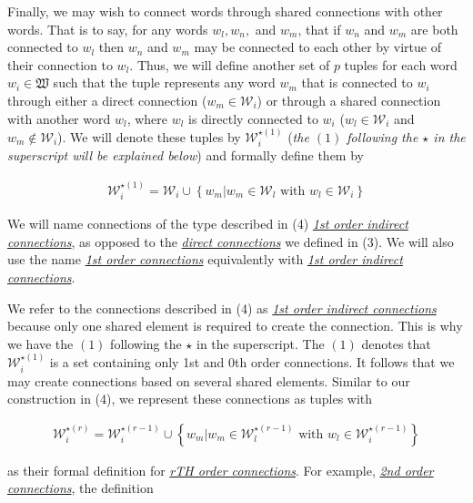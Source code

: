 \documentclass{article}[12pt]
\begin{document}
\begin{flushleft}
Finally, we may wish to connect words through shared connections with other words.  That is to say, for any words $w_l, w_n,$ and $w_m$, that if $w_n$ and $w_m$ are both connected to $w_l$ then $w_n$ and $w_m$ may be connected to each other by virtue of their connection to $w_l$.  Thus, we will define another set of $p$ tuples for each word $w_i \in \mathfrak{W}$ such that the tuple represents any word $w_m$ that is connected to $w_i$ through either a direct connection ($w_m \in \mathcal{W}_i$) or through a shared connection with another word $w_l$, where $w_l$ is directly connected to $w_i$ ($w_l \in \mathcal{W}_i$ and $w_m \notin \mathcal{W}_i$). We will denote these tuples by $\mathcal{W}^{\star (1)}_i$ (\emph{the $(1)$ following the $\star$ in the superscript will be explained below}) and formally define them by

\begin{align}
\mathcal{W}^{\star (1)}_i = \mathcal{W}_i \cup \left\{ w_m | w_m \in \mathcal{W}_l \text{ with } w_l \in \mathcal{W}_i \right\}
\end{align}

We will name connections of the type described in (4) \underline{\emph{1st order indirect connections}}, as opposed to the \underline{\emph{direct connections}} we defined in (3).  We will also use the name \underline{\emph{1st order connections}} equivalently with \underline{\emph{1st order indirect connections}}. \newline

We refer to the connections described in (4) as \underline{\emph{1st order indirect connections}} because only one shared element is required to create the connection.  This is why we have the $(1)$ following the $\star$ in the superscript.  The $(1)$ denotes that $\mathcal{W}^{\star (1)}_i$ is a set containing only 1st and 0th order connections.  It follows that we may create connections based on several shared elements.  Similar to our construction in (4), we represent these connections as tuples with

\begin{align}
\mathcal{W}^{\star (r)}_i = \mathcal{W}^{\star (r-1)}_i \cup \left\{ w_m | w_m \in \mathcal{W}^{\star (r-1)}_l \text{ with } w_l \in \mathcal{W}^{\star (r-1)}_i \right\}
\end{align}

as their formal definition for \underline{\emph{rTH order connections}}.  For example, \underline{\emph{2nd order connections}}, the definition


\end{flushleft}
\end{document}
